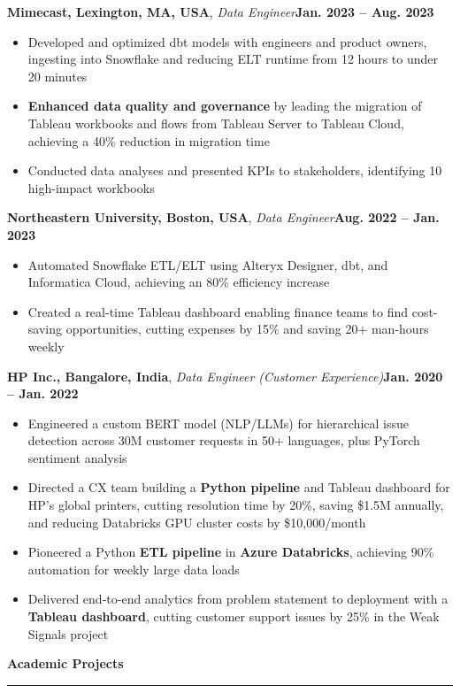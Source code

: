 \documentclass[letterpaper,10pt]{article}
\newcommand{\resumesection}[1]{%
  \vspace{2pt}%
  {\large\bfseries\color{headblue}#1}\par%
  \vspace{1pt}%
  \noindent\rule{\textwidth}{0.6pt}\par%
  \vspace{1pt}%
}
\newcommand{\jobheading}[3]{%
  \textbf{#1}, \textit{#2}\hfill\textbf{#3}\par\vspace{1pt}%
}
\newenvironment{bullets}{%
  \begin{itemize}[leftmargin=0.2in,label=$\bullet$,topsep=1pt,itemsep=1pt,parsep=0pt]%
}{%
  \end{itemize}\vspace{1pt}%
}
\begin{document}
\jobheading{Mimecast, Lexington, MA, USA}{Data Engineer}{Jan. 2023 -- Aug. 2023}
\begin{bullets}
\item Developed and optimized dbt models with engineers and product owners, ingesting into Snowflake and reducing ELT runtime from 12 hours to under 20 minutes
\item \textbf{Enhanced data quality and governance} by leading the migration of Tableau workbooks and flows from Tableau Server to Tableau Cloud, achieving a 40\% reduction in migration time
\item Conducted data analyses and presented KPIs to stakeholders, identifying 10 high-impact workbooks
\end{bullets}

\jobheading{Northeastern University, Boston, USA}{Data Engineer}{Aug. 2022 -- Jan. 2023}
\begin{bullets}
\item Automated Snowflake ETL/ELT using Alteryx Designer, dbt, and Informatica Cloud, achieving an 80\% efficiency increase
\item Created a real-time Tableau dashboard enabling finance teams to find cost-saving opportunities, cutting expenses by 15\% and saving 20+ man-hours weekly
\end{bullets}

\jobheading{HP Inc., Bangalore, India}{Data Engineer (Customer Experience)}{Jan. 2020 -- Jan. 2022}
\begin{bullets}
\item Engineered a custom BERT model (NLP/LLMs) for hierarchical issue detection across 30M customer requests in 50+ languages, plus PyTorch sentiment analysis
\item Directed a CX team building a \textbf{Python pipeline} and Tableau dashboard for HP's global printers, cutting resolution time by 20\%, saving \$1.5M annually, and reducing Databricks GPU cluster costs by \$10,000/month
\item Pioneered a Python \textbf{ETL pipeline} in \textbf{Azure Databricks}, achieving 90\% automation for weekly large data loads
\item Delivered end-to-end analytics from problem statement to deployment with a \textbf{Tableau dashboard}, cutting customer support issues by 25\% in the Weak Signals project
\end{bullets}

\resumesection{Academic Projects}
\end{document}
